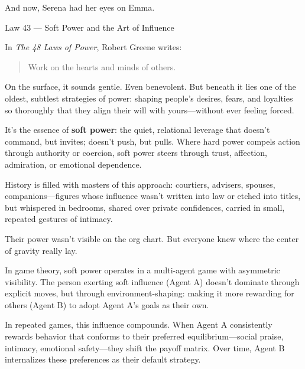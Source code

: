 And now, Serena had her eyes on Emma.

\medskip

\begin{PhilosophicalSidebar}{Law 43 --- Soft Power and the Art of Influence}

  In \textit{The 48 Laws of Power}, Robert Greene writes:
  
  \begin{quote}
  Work on the hearts and minds of others.
  \end{quote}
  
  On the surface, it sounds gentle. Even benevolent. But beneath it lies one of the oldest, subtlest strategies of
  power: shaping people’s desires, fears, and loyalties so thoroughly that they align their will with yours—without
  ever feeling forced.
  
  \medskip
  
  It’s the essence of \textbf{soft power}: the quiet, relational leverage that doesn’t command, but invites; doesn’t
  push, but pulls. Where hard power compels action through authority or coercion, soft power steers through trust,
  affection, admiration, or emotional dependence.
  
  \medskip
  
  History is filled with masters of this approach: courtiers, advisers, spouses, companions—figures whose influence
  wasn’t written into law or etched into titles, but whispered in bedrooms, shared over private confidences, carried
  in small, repeated gestures of intimacy.
  
  \medskip
  
  Their power wasn’t visible on the org chart. But everyone knew where the center of gravity really lay.
  
  \medskip
  
  In game theory, soft power operates in a multi-agent game with asymmetric visibility. The person exerting 
  soft influence (Agent A) doesn’t dominate through explicit moves, but through environment-shaping: making it 
  more rewarding for others (Agent B) to adopt Agent A’s goals as their own.
  
  \medskip
  
  In repeated games, this influence compounds. When Agent A consistently rewards behavior that conforms to 
  their preferred equilibrium—social praise, intimacy, emotional safety—they shift the payoff matrix. Over time, 
  Agent B internalizes these preferences as their default strategy.
  

\end{PhilosophicalSidebar}
